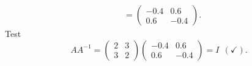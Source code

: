 {\begin{enumerate}
\begin{align*}
 	&=\begin{pmatrix}-0.4&0.6\\0.6&-0.4\end{pmatrix}.
\end{align*}
Test
$$AA^{-1} =  \begin{pmatrix}2&3\\3&2 \end{pmatrix}\begin{pmatrix}-0.4&0.6\\0.6&-0.4\end{pmatrix} = I~~(\checkmark).$$
\end{enumerate}
}
